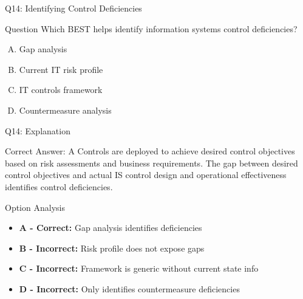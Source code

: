 \documentclass{beamer}
\begin{document}
	
	
	
	\begin{frame}{Q14: Identifying Control Deficiencies}
		\begin{block}{Question}
			Which BEST helps identify information systems control deficiencies?
		\end{block}
		\begin{enumerate}[(A)]
			\item Gap analysis
			\item Current IT risk profile
			\item IT controls framework
			\item Countermeasure analysis
		\end{enumerate}
	\end{frame}
	
	\begin{frame}{Q14: Explanation}
		\begin{block}{Correct Answer: A}
			Controls are deployed to achieve desired control objectives based on risk assessments and business requirements. The gap between desired control objectives and actual IS control design and operational effectiveness identifies control deficiencies.
		\end{block}
		\begin{block}{Option Analysis}
			\begin{itemize}
				\item \textbf{A - Correct:} Gap analysis identifies deficiencies
				\item \textbf{B - Incorrect:} Risk profile does not expose gaps
				\item \textbf{C - Incorrect:} Framework is generic without current state info
				\item \textbf{D - Incorrect:} Only identifies countermeasure deficiencies
			\end{itemize}
		\end{block}
	\end{frame}
	
	
	
	
	
	
	
	
	
\end{document}
